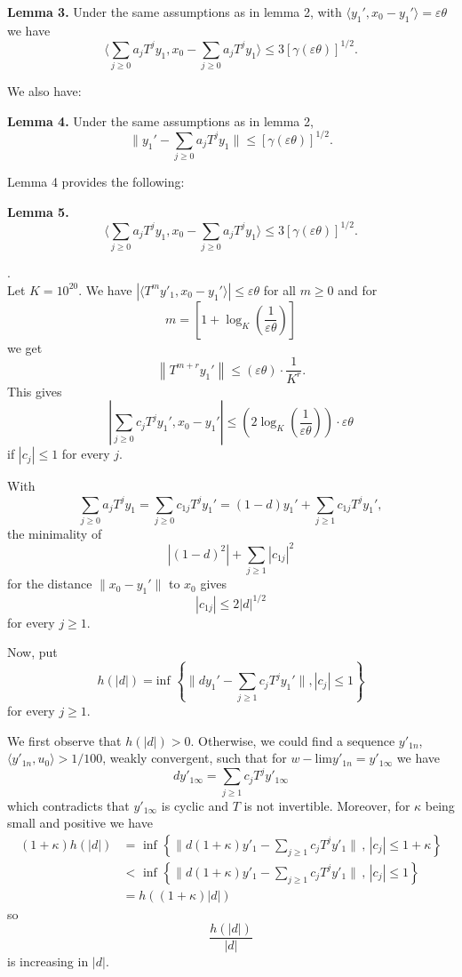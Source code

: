 \documentclass[12pt,oneside,reqno]{amsart}
\theoremstyle{definition}
\begin{document}
\noindent \textbf{Lemma 3.} Under the same assumptions as in lemma 2, with $\langle y_1', x_0 - y_1'\rangle = \varepsilon \theta$ we have
$$\langle \sum_{j \ge 0} a_j T^j y_1, x_0 - \sum_{j \ge 0} a_j T^j y_1\rangle \le 3 \left[ \gamma (\varepsilon\theta)\right]^{1/2}.$$

We also have:
\bigskip

\noindent \textbf{Lemma 4.}  Under the same assumptions as in lemma 2,
$$\|y_1' - \sum_{j \ge 0} a_j T^j y_1\|\le \left[ \gamma (\varepsilon\theta)\right]^{1/2}.$$ 

Lemma 4 provides the following:
\bigskip

\noindent \textbf{Lemma 5.} 
$$\langle \sum_{j \ge 0} a_j T^j y_1, x_0 - \sum_{j \ge 0} a_j T^j y_1\rangle \le 3 \left[ \gamma (\varepsilon\theta)\right]^{1/2}.$$

\bigskip
{}.\\
Let $K = 10^{20}$. We have $\displaystyle \left|\langle T^m y'_1, x_0 - y_1'\rangle \right| \le \varepsilon\theta$ for all $m \ge 0$ and for 
$$m = \left[ 1+ \log_{K} \left(\frac{1}{\varepsilon\theta}\right)\right]$$
we get 
$$\left\| T^{m+r} y_1'\right\| \le (\varepsilon\theta) \cdot \frac{1}{K^r}.$$
This gives
$$\left| \sum_{j \ge 0} c_j T^j y_1', x_0 - y_1'\right| \le \left( 2 \log_{K} \left(\frac{1}{\varepsilon\theta}\right) \right) \cdot \varepsilon\theta$$
if $|c_j| \le 1$ for every $j$.

With 
$$\sum_{j \ge 0} a_j T^j y_1 = \sum_{j\ge0} c_{1j} T^j y_1' = (1-d) y_1' + \sum_{j \ge 1} c_{1 j} T^j y_1',$$
the minimality of
$$|(1-d)^2| + \sum_{j \ge 1} |c_{1 j}|^2$$
for the distance $\|x_0 - y_1'\|$ to $x_0$ gives
$$|c_{1 j}| \le 2 |d|^{1/2}$$
for every  $j \ge 1.$ 

Now, put 
$$h (|d|) = \text{inf } \left\{ \|d y_1' - \sum_{j \ge 1} c_j T^j y_1' \|, |c_j|\le 1\right\}$$
for every $j \ge 1$.

We first observe that $h (|d|) > 0$. Otherwise, we could find a sequence $y'_{1 n}$, $\langle y'_{1 n}, u_0\rangle > 1/100$, weakly convergent, such that for $w-\text{lim} y'_{1 n} = y'_{1 \infty}$ we have 
$$d y'_{1 \infty} = \sum_{j \ge 1} c_j T^j y'_{1 \infty}$$
which contradicts that $y'_{1 \infty}$ is cyclic and $T$ is not invertible. Moreover, for $\kappa$  being small and positive we have
\begin{align*}
(1+\kappa) h(|d|)&= \text{ inf } \left\{\|d (1+ \kappa ) y'_1 - \sum_{j \ge 1}c_j T^j y'_1\| \, , \, |c_j| \le 1 + \kappa \right\}\\
& < \text{ inf } \left\{ \|d (1+\kappa) y'_1 - \sum_{j \ge 1}c_j T^j y'_1\| \, , \, |c_j| \le 1 \right\}\\
& = h ((1+\kappa)|d|) 
\end{align*}
so $$\frac{h(|d|)}{|d|}$$ is increasing in $|d|$.
\end{document}
